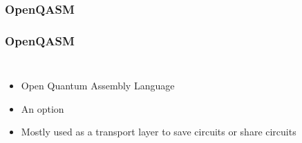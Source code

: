 \documentclass[aspectratio=169,11pt,hyperref={colorlinks=true}]{beamer}
\begin{document}
%

\subsubsection{OpenQASM}
\begin{frame}
    \frametitle{OpenQASM\footnotemark[1]\footnotemark[2]}
    \begin{columns}
            
            \begin{itemize}
                \item Open Quantum Assembly Language
                \item An option
                \item Mostly used as a transport layer to save circuits
                    or share circuits
            \end{itemize}
    \end{columns}
\end{frame}
\end{document}
